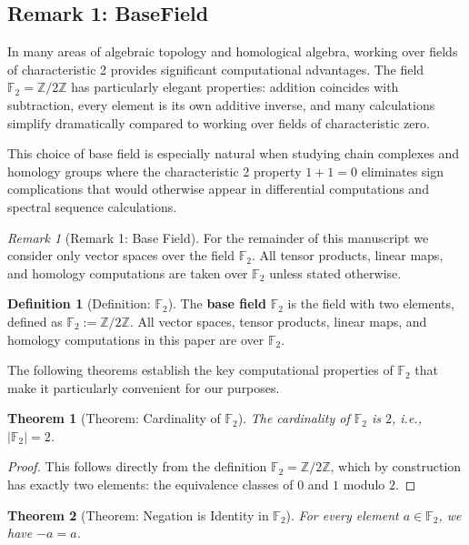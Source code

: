 \documentclass[11pt]{article}
\theoremstyle{plain}
\newtheorem*{theorem}{Theorem}
\theoremstyle{definition}
\newtheorem*{definition}{Definition}
\theoremstyle{remark}
\newtheorem*{remark}{Remark}
\begin{document}
\subsection{Remark 1: BaseField}

In many areas of algebraic topology and homological algebra, working over fields of characteristic 2 provides significant computational advantages. The field $\mathbb{F}_2 = \mathbb{Z}/2\mathbb{Z}$ has particularly elegant properties: addition coincides with subtraction, every element is its own additive inverse, and many calculations simplify dramatically compared to working over fields of characteristic zero.

This choice of base field is especially natural when studying chain complexes and homology groups where the characteristic 2 property $1 + 1 = 0$ eliminates sign complications that would otherwise appear in differential computations and spectral sequence calculations.

\begin{remark}[Remark 1: Base Field]
For the remainder of this manuscript we consider only vector spaces over the field $\mathbb{F}_2$. All tensor products, linear maps, and homology computations are taken over $\mathbb{F}_2$ unless stated otherwise.
\end{remark}

\begin{definition}[Definition: $\mathbb{F}_2$]
The \textbf{base field} $\mathbb{F}_2$ is the field with two elements, defined as $\mathbb{F}_2 := \mathbb{Z}/2\mathbb{Z}$. All vector spaces, tensor products, linear maps, and homology computations in this paper are over $\mathbb{F}_2$.
\end{definition}

The following theorems establish the key computational properties of $\mathbb{F}_2$ that make it particularly convenient for our purposes.

\begin{theorem}[Theorem: Cardinality of $\mathbb{F}_2$]
The cardinality of $\mathbb{F}_2$ is $2$, i.e., $|\mathbb{F}_2| = 2$.
\end{theorem}

\begin{proof}
This follows directly from the definition $\mathbb{F}_2 = \mathbb{Z}/2\mathbb{Z}$, which by construction has exactly two elements: the equivalence classes of $0$ and $1$ modulo $2$.
\end{proof}

\begin{theorem}[Theorem: Negation is Identity in $\mathbb{F}_2$]
For every element $a \in \mathbb{F}_2$, we have $-a = a$.
\end{theorem}
\end{document}
